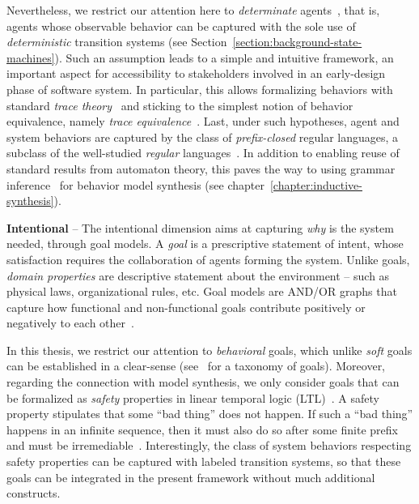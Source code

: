 Nevertheless, we restrict our attention here to \emph{determinate} agents~\cite{Engelfriet:1985}, that is, agents whose observable behavior can be captured with the sole use of \emph{deterministic} transition systems (see Section~\ref{section:background-state-machines}). Such an assumption leads to a simple and intuitive framework, an important aspect for accessibility to stakeholders involved in an early-design phase of software system. In particular, this allows formalizing behaviors with standard \emph{trace theory}~\cite{Hoare:1985} and sticking to the simplest notion of behavior equivalence, namely \emph{trace equivalence}~\cite{Engelfriet:1985}. Last, under such hypotheses, agent and system behaviors are captured by the class of \emph{prefix-closed} regular languages, a subclass of the well-studied \emph{regular} languages~\cite{Hopcroft:1979, Aho:1986}. In addition to enabling reuse of standard results from automaton theory, this paves the way to using grammar inference~\cite{Gold:1978} for behavior model synthesis (see chapter~\ref{chapter:inductive-synthesis}). 

\noindent \textbf{Intentional} -- The intentional dimension aims at capturing \emph{why} is the system needed, through goal models. A \emph{goal} is a prescriptive statement of intent, whose satisfaction requires the collaboration of agents forming the system. Unlike goals, \emph{domain properties} are descriptive statement about the environment -- such as physical laws, organizational rules, etc. Goal models are AND/OR graphs that capture how functional and non-functional goals contribute positively or negatively to each other~\cite{VanLamsweerde:2000, VanLamsweerde:2004}.

In this thesis, we restrict our attention to \emph{behavioral} goals, which unlike \emph{soft} goals can be established in a clear-sense (see~\cite{VanLamsweerde:2009} for a taxonomy of goals). Moreover, regarding the connection with model synthesis, we only consider goals that can be formalized as \emph{safety} properties in linear temporal logic (LTL)~\cite{Manna:1992}. A safety property stipulates that some ``bad thing'' does not happen. If such a ``bad thing'' happens in an infinite sequence, then it must also do so after some finite prefix and must be irremediable~\cite{Alpern:1986, Giannakopoulou:1999}. Interestingly, the class of system behaviors respecting safety properties can be captured with labeled transition systems, so that these goals can be integrated in the present framework without much additional constructs.

